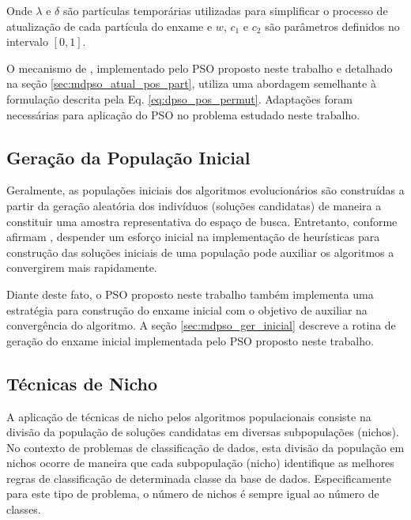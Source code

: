 \documentclass[
	12pt,				%
	openany,			%
	oneside,	
	a4paper,			%
	brazil,				%
	]{unimontes-ppgmsc-abntex2}
\begin{document}
Onde $\lambda$ e $\delta$ são partículas temporárias utilizadas para simplificar o processo de atualização de cada partícula do enxame e $w$, $c_1$ e $c_2$ são parâmetros definidos no intervalo $[0,1]$.


O mecanismo de , implementado pelo PSO proposto neste trabalho e detalhado na seção \ref{sec:mdpso_atual_pos_part}, utiliza uma abordagem semelhante à formulação descrita pela Eq. \ref{eq:dpso_pos_permut}. Adaptações foram necessárias para aplicação do PSO no problema estudado neste trabalho.


\subsection{Geração da População Inicial}
\label{sec:ger_inicial}

Geralmente, as populações iniciais dos algoritmos evolucionários são construídas a partir da geração aleatória dos indivíduos (soluções candidatas) de maneira a constituir uma amostra representativa do espaço de busca. Entretanto, conforme afirmam , despender um esforço inicial na implementação de heurísticas para construção das soluções iniciais de uma população pode auxiliar os algoritmos a convergirem mais rapidamente. 

Diante deste fato, o PSO proposto neste trabalho também implementa uma estratégia para construção do enxame inicial com o objetivo de auxiliar na convergência do algoritmo. A seção \ref{sec:mdpso_ger_inicial} descreve a rotina de geração do enxame inicial implementada pelo PSO proposto neste trabalho.

\subsection{Técnicas de Nicho}
\label{sec:tec_nicho}

A aplicação de técnicas de nicho pelos algoritmos populacionais consiste na divisão da população de soluções candidatas em diversas subpopulações (nichos). No contexto de problemas de classificação de dados, esta divisão da população em nichos ocorre de maneira que cada subpopulação (nicho) identifique as melhores regras de classificação de determinada classe da base de dados. Especificamente para este tipo de problema, o número de nichos é sempre igual ao número de classes.
\end{document}
